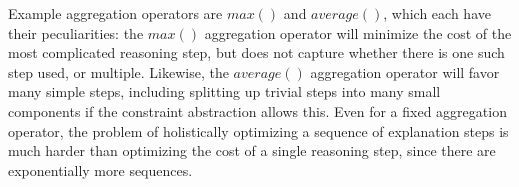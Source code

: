 Example aggregation operators are $max()$ and $average()$, which each have their peculiarities: the $max()$ aggregation operator will minimize the cost of the most complicated reasoning step, but does not capture whether there is one such step used, or multiple. Likewise, the $average()$ aggregation operator will favor many simple steps, including splitting up trivial steps into many small components if the constraint abstraction allows this.
% 
Even for a fixed aggregation operator, the problem of holistically optimizing a sequence of explanation steps is much harder than optimizing the cost of a single reasoning step, since there are exponentially more sequences. 









